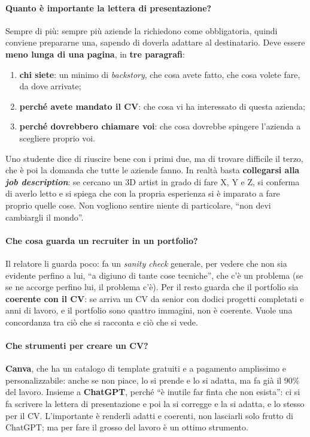 \paragraph{Quanto è importante la lettera di presentazione?} Sempre di più: sempre più aziende la richiedono come
obbligatoria, quindi conviene prepararne una, sapendo di doverla adattare al destinatario. Deve essere \textbf{meno lunga
di una pagina}, in \textbf{tre paragrafi}:
\begin{enumerate}
  \item \textbf{chi siete}: un minimo di \emph{backstory}, che cosa avete fatto, che cosa volete fare, da dove arrivate;
  \item \textbf{perché avete mandato il CV}: che cosa vi ha interessato di questa azienda;
  \item \textbf{perché dovrebbero chiamare voi}: che cosa dovrebbe spingere l'azienda a scegliere proprio voi.
\end{enumerate}
Uno studente dice di riuscire bene con i primi due, ma di trovare difficile il terzo, che è poi la domanda che tutte le
aziende fanno. In realtà basta \textbf{collegarsi alla \emph{job description}}: se cercano un 3D artist in grado di fare
X, Y e Z, si conferma di averlo letto e si spiega che con la propria esperienza si è imparato a fare proprio quelle cose.
Non vogliono sentire niente di particolare, ``non devi cambiargli il mondo''.

\paragraph{Che cosa guarda un recruiter in un portfolio?} Il relatore li guarda poco: fa un \emph{sanity check} generale,
per vedere che non sia evidente perfino a lui, ``a digiuno di tante cose tecniche'', che c'è un problema (se se ne accorge
perfino lui, il problema c'è). Per il resto guarda che il portfolio sia \textbf{coerente con il CV}: se arriva un CV da
senior con dodici progetti completati e anni di lavoro, e il portfolio sono quattro immagini, non è coerente. Vuole una
concordanza tra ciò che si racconta e ciò che si vede.

\paragraph{Che strumenti per creare un CV?} \textbf{Canva}, che ha un catalogo di template gratuiti e a pagamento
amplissimo e personalizzabile: anche se non piace, lo si prende e lo si adatta, ma fa già il 90\% del lavoro. Insieme a
\textbf{ChatGPT}, perché ``è inutile far finta che non esista'': ci si fa scrivere la lettera di presentazione e poi la si
corregge e la si adatta, e lo stesso per il CV. L'importante è renderli adatti e coerenti, non lasciarli solo frutto di
ChatGPT; ma per fare il grosso del lavoro è un ottimo strumento.


